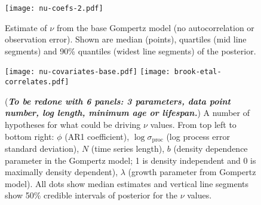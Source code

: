 \documentclass[11pt]{article}
\begin{document}
\clearpage

\begin{figure}[htbp]
\begin{center}
\texttt{[image: nu-coefs-2.pdf]}
\caption{
  Estimate of $\nu$ from the base Gompertz model (no autocorrelation or observation error).
  Shown are median (points), quartiles (mid line segments) and 90\% quantiles (widest line segments) of the posterior.}
\label{fig:nu-coefs}
\end{center}
\end{figure}

\clearpage


\clearpage

\begin{figure}[htbp]
\begin{center}
\texttt{[image: nu-covariates-base.pdf]}
\texttt{[image: brook-etal-correlates.pdf]}
\caption{
  (\textit{\textbf{To be redone with 6 panels: 3 parameters, data point number, log length, minimum age or lifespan.}})
  A number of hypotheses for what could be driving $\nu$ values. From top left to bottom right: $\phi$ (AR1 coefficient), $\log \sigma_\mathrm{proc}$ (log process error standard deviation), $N$ (time series length), $b$ (density dependence parameter in the Gompertz model; 1 is density independent and 0 is maximally density dependent), $\lambda$ (growth parameter from Gompertz model).  
  All dots show median estimates and vertical line segments show 50\% credible intervals of posterior for the $\nu$ values.}
\label{fig:correlates}
\end{center}
\end{figure}
\end{document}
